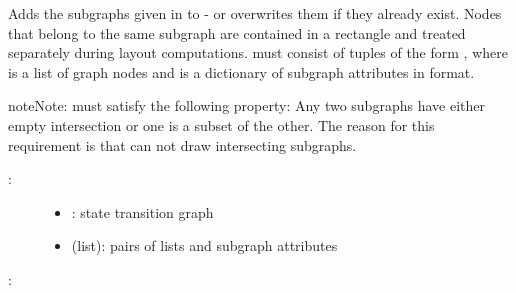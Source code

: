 \documentclass[letterpaper,10pt,english]{sphinxmanual}
\begin{document}
\begin{fulllineitems}
\label{\detokenize{StateTransitionGraphs:PyBoolNet.StateTransitionGraphs.add_style_subgraphs}}
Adds the subgraphs given in  to  - or overwrites them if they already exist.
Nodes that belong to the same  subgraph are contained in a rectangle and treated separately during layout computations.
 must consist of tuples of the form ,  where  is a list of graph nodes and 
is a dictionary of subgraph attributes in  format.

\begin{sphinxadmonition}{note}{Note:}
 must satisfy the following property:
Any two subgraphs have either empty intersection or one is a subset of the other.
The reason for this requirement is that  can not draw intersecting subgraphs.
\end{sphinxadmonition}
\begin{description}
\item[{:}] \leavevmode\begin{itemize}
\item {} 
: state transition graph

\item {} 
 (list): pairs of lists and subgraph attributes

\end{itemize}

\end{description}

:

\begin{sphinxVerbatim}[commandchars=\\\{\}]
  \PYG{p}{[}\PYG{p}{]} 
  \PYG{p}{[}\PYG{p}{]} 
  \PYG{p}{[}\PYG{p}{]}
 
\end{sphinxVerbatim}

\end{fulllineitems}
\end{document}
